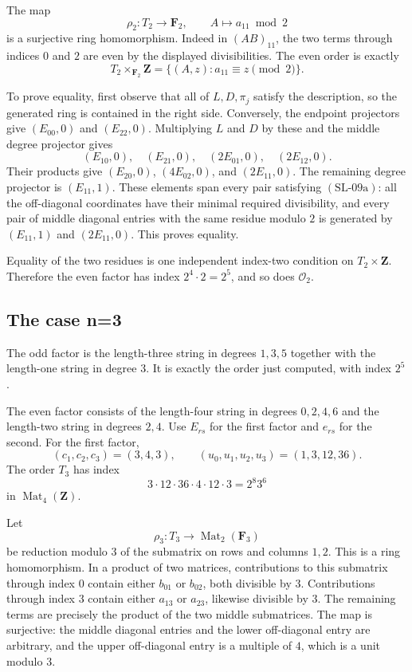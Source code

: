 The map
\[
\rho_2:T_2\longrightarrow\mathbf F_2,\qquad
A\longmapsto a_{11}\bmod2
\]
is a surjective ring homomorphism.  Indeed in
\((AB)_{11}\), the two terms through indices \(0\) and \(2\)
are even by the displayed divisibilities.  The even order is
exactly
\[
T_2\times_{\mathbf F_2}\mathbf Z
=\{(A,z):a_{11}\equiv z\pmod2\}.
\tag{SL-09a}
\]

To prove equality, first observe that all of \(L,D,\pi_j\)
satisfy the description, so the generated ring is contained in
the right side.  Conversely, the endpoint projectors give
\((E_{00},0)\) and \((E_{22},0)\).  Multiplying \(L\) and \(D\)
by these and the middle degree projector gives
\[
(E_{10},0),\quad(E_{21},0),\quad
(2E_{01},0),\quad(2E_{12},0).
\]
Their products give \((E_{20},0)\), \((4E_{02},0)\), and
\((2E_{11},0)\).  The remaining degree projector is
\((E_{11},1)\).  These elements span every pair satisfying
\((\mathrm{SL\text{-}09a})\): all the off-diagonal coordinates
have their minimal required divisibility, and every pair of
middle diagonal entries with the same residue modulo \(2\)
is generated by \((E_{11},1)\) and \((2E_{11},0)\).
This proves equality.

Equality of the two residues is one independent index-two
condition on \(T_2\times\mathbf Z\).  Therefore the even factor
has index \(2^4\cdot2=2^5\), and so does \(\mathcal O_2\).

\subsection{The case n=3}

The odd factor is the length-three string in degrees \(1,3,5\)
together with the length-one string in degree \(3\).  It is
exactly the order just computed, with index \(2^5\).

The even factor consists of the length-four string in degrees
\(0,2,4,6\) and the length-two string in degrees \(2,4\).
Use \(E_{rs}\) for the first factor and \(e_{rs}\) for the second.
For the first factor,
\[
(c_1,c_2,c_3)=(3,4,3),\qquad
(u_0,u_1,u_2,u_3)=(1,3,12,36).
\]
The order \(T_3\) has index
\[
3\cdot12\cdot36\cdot4\cdot12\cdot3
=2^8 3^6
\tag{SL-09b}
\]
in \(\operatorname{Mat}_4(\mathbf Z)\).

Let
\[
\rho_3:T_3\longrightarrow\operatorname{Mat}_2(\mathbf F_3)
\]
be reduction modulo \(3\) of the submatrix on rows and columns
\(1,2\).  This is a ring homomorphism.  In a product of two
matrices, contributions to this submatrix through index \(0\)
contain either \(b_{01}\) or \(b_{02}\), both divisible by \(3\).
Contributions through index \(3\) contain either \(a_{13}\) or
\(a_{23}\), likewise divisible by \(3\).  The remaining terms
are precisely the product of the two middle submatrices.
The map is surjective: the middle diagonal entries and the
lower off-diagonal entry are arbitrary, and the upper
off-diagonal entry is a multiple of \(4\), which is a unit
modulo \(3\).

